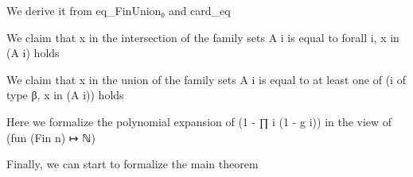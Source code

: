 \begin{lemma}\label{card_eq_FinUnion}
                We derive it from eq_FinUnion₀ and card_eq
    \end{lemma}

\begin{lemma}\label{char_fun_FinInter}
                We claim that x in the intersection of the family sets {A i} is equal to forall i, x in (A i) holds
    \end{lemma}

\begin{lemma}\label{char_fun_FinUnion}
                We claim that x in the union of the family sets {A i} is equal to at least one of (i of type β, x in (A i)) holds
    \end{lemma}

\begin{lemma}\label{mul_expand₀}
                Here we formalize the polynomial expansion of (1 - ∏ i (1 - g i)) in the view of (fun (Fin n) ↦ ℕ)
    \end{lemma}

\begin{theorem}\label{Principle_of_Inclusion_Exclusion}
                Finally, we can start to formalize the main theorem
    \end{theorem}

